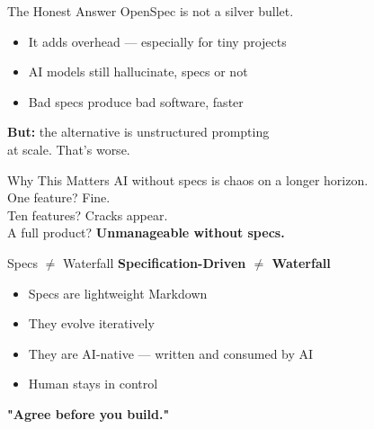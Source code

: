 \documentclass[aspectratio=169,18pt]{beamer}
\begin{document}
\begin{frame}{The Honest Answer}
  \vspace{0.5em}
  \large OpenSpec is not a silver bullet.\\[1em]
  \normalsize
  \begin{itemize}\setlength\itemsep{0.5em}
    \item It adds overhead — especially for tiny projects
    \item AI models still hallucinate, specs or not
    \item Bad specs produce bad software, faster
  \end{itemize}
  \vspace{0.8em}
  \textbf{But:} the alternative is unstructured prompting\\
  at scale. That's worse.

\end{frame}


\begin{frame}{Why This Matters}
  \vspace{0.5em}
  \large AI without specs is chaos on a longer horizon.\\[1.5em]
  \normalsize
  One feature? Fine.\\[0.3em]
  Ten features? Cracks appear.\\[0.3em]
  A full product? \textbf{Unmanageable without specs.}
\end{frame}

\begin{frame}{Specs $\neq$ Waterfall}
  \vspace{0.5em}
  \large\textbf{Specification-Driven $\neq$ Waterfall}\\[1em]
  \normalsize
  \begin{itemize}\setlength\itemsep{0.5em}
    \item Specs are lightweight Markdown
    \item They evolve iteratively
    \item They are AI-native — written and consumed by AI
    \item Human stays in control
  \end{itemize}
\end{frame}

\begin{frame}{}
  \vspace{3em}
  \begin{center}
    {\Large\textbf{"Agree before you build."}}
  \end{center}
\end{frame}
\end{document}
